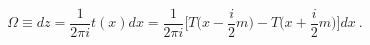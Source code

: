 \begin{equation}
  \label{eq:dzFT}
\Omega\equiv dz=\frac{1}{2\pi i}t(x) dx=\frac{1}{2\pi
  i}\Big[T\Big(x-\frac{i}{2}m\Big)- T\Big(x+\frac{i}{2}m\Big)\Big] dx\ .
\end{equation}

